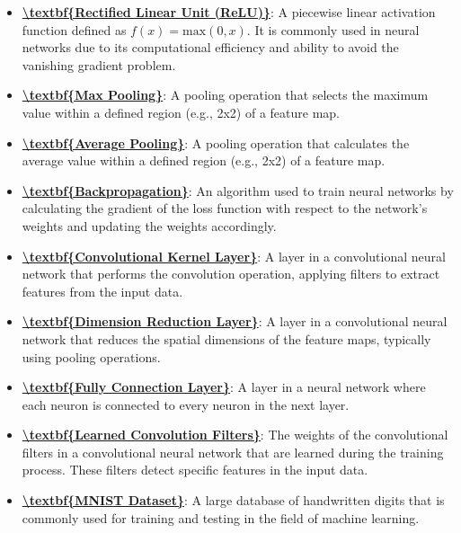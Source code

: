 \documentclass{article}%
\begin{document}
\begin{itemize}[leftmargin=*]
\item \href{https://www.math.purdue.edu/~yipn/351/09L1-cnn.pdf#page=13}{\textbf{\textbackslash{}textbf\{Rectified Linear Unit (ReLU)\}}}: A piecewise linear activation function defined as $f(x) = \text{max}(0, x)$. It is commonly used in neural networks due to its computational efficiency and ability to avoid the vanishing gradient problem.%
\item \href{https://www.math.purdue.edu/~yipn/351/09L1-cnn.pdf#page=14}{\textbf{\textbackslash{}textbf\{Max Pooling\}}}: A pooling operation that selects the maximum value within a defined region (e.g., 2x2) of a feature map.%
\item \href{https://www.math.purdue.edu/~yipn/351/09L1-cnn.pdf#page=15}{\textbf{\textbackslash{}textbf\{Average Pooling\}}}: A pooling operation that calculates the average value within a defined region (e.g., 2x2) of a feature map.%
\item \href{https://www.math.purdue.edu/~yipn/351/09L1-cnn.pdf#page=16}{\textbf{\textbackslash{}textbf\{Backpropagation\}}}: An algorithm used to train neural networks by calculating the gradient of the loss function with respect to the network's weights and updating the weights accordingly.%
\item \href{https://www.math.purdue.edu/~yipn/351/09L1-cnn.pdf#page=17}{\textbf{\textbackslash{}textbf\{Convolutional Kernel Layer\}}}: A layer in a convolutional neural network that performs the convolution operation, applying filters to extract features from the input data.%
\item \href{https://www.math.purdue.edu/~yipn/351/09L1-cnn.pdf#page=17}{\textbf{\textbackslash{}textbf\{Dimension Reduction Layer\}}}: A layer in a convolutional neural network that reduces the spatial dimensions of the feature maps, typically using pooling operations.%
\item \href{https://www.math.purdue.edu/~yipn/351/09L1-cnn.pdf#page=17}{\textbf{\textbackslash{}textbf\{Fully Connection Layer\}}}: A layer in a neural network where each neuron is connected to every neuron in the next layer.%
\item \href{https://www.math.purdue.edu/~yipn/351/09L1-cnn.pdf#page=18}{\textbf{\textbackslash{}textbf\{Learned Convolution Filters\}}}: The weights of the convolutional filters in a convolutional neural network that are learned during the training process. These filters detect specific features in the input data.%
\item \href{https://www.math.purdue.edu/~yipn/351/09L1-cnn.pdf#page=21}{\textbf{\textbackslash{}textbf\{MNIST Dataset\}}}: A large database of handwritten digits that is commonly used for training and testing in the field of machine learning.%

\end{itemize}
\end{document}
